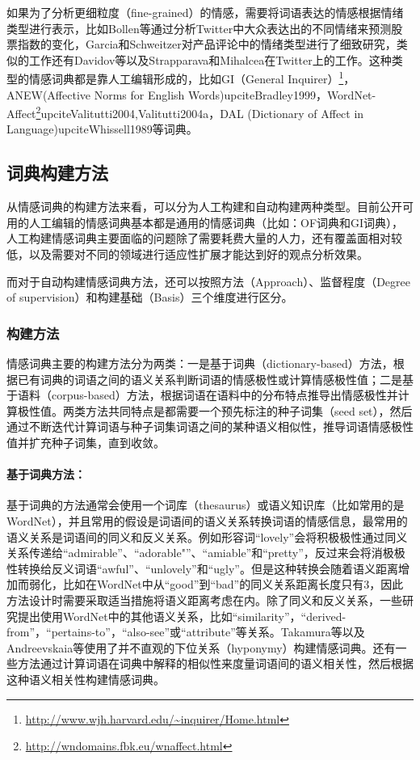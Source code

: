 如果为了分析更细粒度（fine-grained）的情感，需要将词语表达的情感根据情绪类型进行表示，比如Bollen等通过分析Twitter中大众表达出的不同情绪来预测股票指数的变化，Garcia和Schweitzer对产品评论中的情绪类型进行了细致研究，类似的工作还有Davidov等以及Strapparava和Mihalcea在Twitter上的工作。这种类型的情感词典都是靠人工编辑形成的，比如GI（General Inquirer）\footnote{\url{http://www.wjh.harvard.edu/~inquirer/Home.html}}，ANEW(Affective Norms for English Words)upcite{Bradley1999}，WordNet-Affect\footnote{\url{http://wndomains.fbk.eu/wnaffect.html}}upcite{Valitutti2004,Valitutti2004a}，DAL (Dictionary of Affect in Language)upcite{Whissell1989}等词典。

\subsection{词典构建方法}
从情感词典的构建方法来看，可以分为人工构建和自动构建两种类型。目前公开可用的人工编辑的情感词典基本都是通用的情感词典（比如：OF词典和GI词典），人工构建情感词典主要面临的问题除了需要耗费大量的人力，还有覆盖面相对较低，以及需要对不同的领域进行适应性扩展才能达到好的观点分析效果。

而对于自动构建情感词典方法，还可以按照方法（Approach）、监督程度（Degree of supervision）和构建基础（Basis）三个维度进行区分。

\subsubsection{构建方法}
情感词典主要的构建方法分为两类：一是基于词典（dictionary-based）方法，根据已有词典的词语之间的语义关系判断词语的情感极性或计算情感极性值；二是基于语料（corpus-based）方法，根据词语在语料中的分布特点推导出情感极性并计算极性值。两类方法共同特点是都需要一个预先标注的种子词集（seed set），然后通过不断迭代计算词语与种子词集词语之间的某种语义相似性，推导词语情感极性值并扩充种子词集，直到收敛。

\paragraph{基于词典方法：}
基于词典的方法通常会使用一个词库（thesaurus）或语义知识库（比如常用的是WordNet），并且常用的假设是词语间的语义关系转换词语的情感信息，最常用的语义关系是词语间的同义和反义关系。例如形容词“lovely”会将积极极性通过同义关系传递给“admirable”、“adorable"”、“amiable”和“pretty”，反过来会将消极极性转换给反义词语“awful”、“unlovely”和“ugly”。但是这种转换会随着语义距离增加而弱化，比如在WordNet中从“good”到“bad”的同义关系距离长度只有3，因此方法设计时需要采取适当措施将语义距离考虑在内。除了同义和反义关系，一些研究提出使用WordNet中的其他语义关系，比如“similarity”，“derived-from”，“pertains-to”，“also-see”或“attribute”等关系。Takamura等以及Andreevskaia等使用了并不直观的下位关系（hyponymy）构建情感词典。还有一些方法通过计算词语在词典中解释的相似性来度量词语间的语义相关性，然后根据这种语义相关性构建情感词典。

